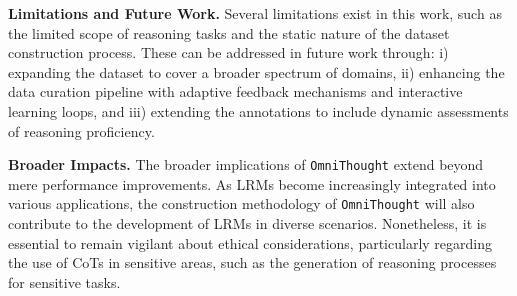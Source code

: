 \documentclass{article}
\begin{document}
\textbf{Limitations and Future Work.} Several limitations exist in this work, such as the limited scope of reasoning tasks and the static nature of the dataset construction process. These can be addressed in future work through: i) expanding the dataset to cover a broader spectrum of domains, ii) enhancing the data curation pipeline with adaptive feedback mechanisms and interactive learning loops, and iii) extending the annotations to include dynamic assessments of reasoning proficiency.

\textbf{Broader Impacts.} The broader implications of \texttt{OmniThought} extend beyond mere performance improvements. As LRMs become increasingly integrated into various applications, the construction methodology of \texttt{OmniThought} will also contribute to the development of LRMs in diverse scenarios. Nonetheless, it is essential to remain vigilant about ethical considerations, particularly regarding the use of CoTs in sensitive areas, such as the generation of reasoning processes for sensitive tasks.




\newpage
\medskip
\end{document}
